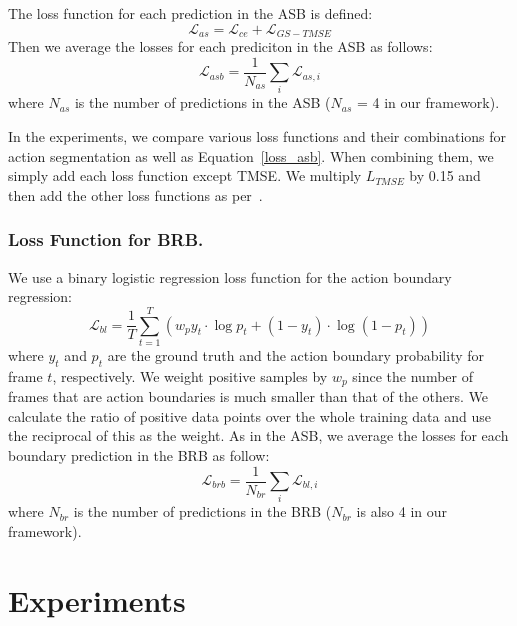 \documentclass[10pt,twocolumn,letterpaper]{article}
\begin{document}
The loss function for each prediction in the ASB is defined:
\begin{equation}
\label{loss_asb}
    \mathcal{L}_{as}= \mathcal{L}_{ce} + \mathcal{L}_{GS-TMSE} 
\end{equation}
Then we average the losses for each prediciton in the ASB as follows:
\begin{equation}
\label{loss_asb}
    \mathcal{L}_{asb}= \frac{1}{{N}_{as}} \sum_{i} \mathcal{L}_{as, i}
\end{equation}
where $N_{as}$ is the number of predictions in the ASB ($N_{as}$ = 4 in our framework).

In the experiments, we compare various loss functions and their combinations for action segmentation as well as Equation~\ref{loss_asb}. When combining them, we simply add each loss function except TMSE. We multiply $L_{TMSE}$ by 0.15 and then add the other loss functions as per~\cite{mstcn}. 



\subsubsection{Loss Function for BRB.}
\label{sec:loss_brb}
We use a binary logistic regression loss function for the action boundary regression:
\begin{equation}
\mathcal{L}_{bl}
=\frac{1}{T} \sum_{t=1}^{T}\left(w_{p} y_{t} \cdot \log p_{t} +\left(1-y_{t}\right) \cdot \log \left(1-p_{t}\right)\right)
\end{equation}
\noindent
where $y_t$ and $p_t$ are the ground truth and the action boundary probability for frame $t$, respectively. 
We weight positive samples by $w_p$ since the number of frames that are action boundaries is much smaller than that of the others. 
We calculate the ratio of positive data points over the whole training data and use the reciprocal of this as the weight.
As in the ASB, we average the losses for each boundary prediction in the BRB as follow:
\begin{equation}
\label{loss_asb}
    \mathcal{L}_{brb}= \frac{1}{{N}_{br}} \sum_{i} \mathcal{L}_{bl, i}
\end{equation}
where $N_{br}$ is the number of predictions in the BRB ($N_{br}$ is also 4 in our framework).




\section{Experiments}
\end{document}
